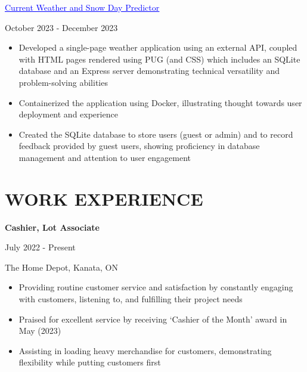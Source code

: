 \documentclass[a4paper,11pt]{article}
\begin{document}
\begin{minipage}{.65\linewidth}
\href{https://github.com/JeremyFriesenGitHub/Weather-App-and-Snow-day-Project}{\textcolor{blue}{\uline{Current Weather and Snow Day Predictor}}}                
\end{minipage}
\hfill
\begin{minipage}{.34\linewidth}
    \flushright
    October 2023 - December 2023
\end{minipage}
\begin{minipage}{\linewidth}
\vspace{10pt}
\begin{itemize}
    \item Developed a single-page weather application using an external API, coupled with HTML pages rendered using PUG (and CSS) which includes an SQLite database and an Express server demonstrating technical versatility and problem-solving abilities
    \item Containerized the application using Docker, illustrating thought towards user deployment and experience
    \item Created the SQLite database to store users (guest or admin) and to record feedback provided by guest users, showing proficiency in database management and attention to user engagement
  \end{itemize}
\end{minipage}


\vspace{2pt}
\section{WORK EXPERIENCE}
\begin{minipage}{.65\linewidth}
    \textbf{Cashier, Lot Associate} 
\end{minipage}
\begin{minipage}{.34\linewidth}
    \flushright
    July 2022 - Present
\end{minipage}
\begin{minipage}{.65\linewidth}
The Home Depot, Kanata, ON
\end{minipage}
\begin{minipage}{\linewidth}
\vspace{10pt}
\begin{itemize}
    \item Providing routine customer service and satisfaction by constantly engaging with customers, listening to, and fulfilling their project needs
    \item Praised for excellent service by receiving ‘Cashier of the Month’ award in May (2023)
    \item Assisting in loading heavy merchandise for customers, demonstrating flexibility while putting customers first
  \end{itemize}
  \end{minipage}
\end{document}
